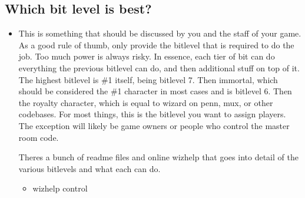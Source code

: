 \documentclass[letterpaper,10pt,english]{sphinxmanual}
\begin{document}
\subsection{Which bit level is best?}
\label{\detokenize{features:which-bit-level-is-best}}\begin{itemize}
\item {} 
\sphinxAtStartPar
This is something that should be discussed by you and the staff
of your game.  As a good rule of thumb, only provide the bitlevel
that is required to do the job.  Too much power is always risky.
In essence, each tier of bit can do everything the previous bitlevel
can do, and then additional stuff on top of it.  The highest bitlevel
is \#1 itself, being bitlevel 7.  Then immortal, which should be
considered the \#1 character in most cases and is bitlevel 6.  Then
the royalty character, which is equal to wizard on penn, mux, or
other codebases.  For most things, this is the bitlevel you want
to assign players.  The exception will likely be game owners or
people who control the master room code.

\sphinxAtStartPar
There\textquotesingle{}s a bunch of readme files and online wizhelp that goes into
detail of the various bitlevels and what each can do.
\begin{itemize}
\item {} 
\sphinxAtStartPar
wizhelp control

\end{itemize}

\end{itemize}
\end{document}
